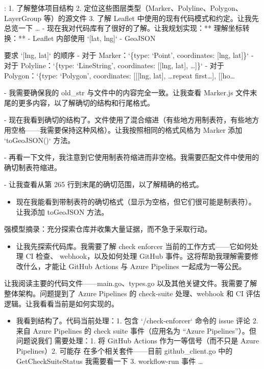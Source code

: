 \documentclass[
  10
]{article}
\providecommand{\tightlist}{%
  \setlength{\itemsep}{0pt}\setlength{\parskip}{0pt}}
\begin{document}
: 1. 了解整体项目结构 2. 定位这些图层类型（Marker、Polyline、Polygon、LayerGroup 等）的源文件 3. 了解 Leaflet 中使用的现有代码模式和约定。让我先总览一下 \ldots{} - 现在我对代码库有了很好的了解。让我规划实现：** 理解坐标转换：** - Leaflet 内部使用 `{[}lat, lng{]}` - GeoJSON



要求 `{[}lng, lat{]}` 的顺序 - 对于 Marker：`\{type: `Point', coordinates: {[}lng, lat{]}\}` - 对于 Polyline：`\{type: `LineString', coordinates: {[}{[}lng, lat{]}, \ldots{]}\}` - 对于 Polygon：`\{type: `Polygon', coordinates: {[}{[}{[}lng, lat{]}, \ldots repeat first\ldots{]}, {[}{[}ho\ldots{}

- 我需要确保我的 old\_str 与文件中的内容完全一致。让我查看 Marker.js 文件末尾的更多内容，以了解确切的结构和行尾格式。

- 现在我看到确切的结构了。文件使用了混合缩进（有些地方用制表符，有些地方用空格——我需要保持这种风格）。让我按照相同的格式风格为 Marker 添加 `toGeoJSON()` 方法。

- 再看一下文件，我注意到它使用制表符缩进而非空格。我需要匹配文件中使用的确切制表符缩进。

- 让我查看从第 265 行到末尾的确切范围，以了解精确的格式。

\begin{itemize}
\tightlist
\item
  现在我能看到带制表符的确切格式（显示为空格，但它们很可能是制表符）。让我添加
  toGeoJSON 方法。
\end{itemize}

强模型摘录：充分探索仓库并收集大量证据，而不急于采取行动。

\begin{itemize}
\tightlist
\item
  让我先探索代码库。我需要了解 check enforcer 当前的工作方式——它如何处理 CI 检查、
  webhook，以及如何处理 GitHub 事件。这将帮助我理解需要修改什么，才能让 GitHub
  Actions 与 Azure Pipelines 一起成为一等公民。
\end{itemize}

让我阅读主要的代码文件——main.go、types.go 以及其他关键文件。我需要了解整体架构。问题提到了 Azure Pipelines 的 check-suite 处理、webhook 和 CI 评估逻辑。让我看看当前是如何实现的。

\begin{itemize}
\tightlist
\item
  我看到结构了。代码当前处理：1. 包含 `/check-enforcer` 命令的 issue 评论 2. 来自
  Azure Pipelines 的 check suite 事件（应用名为 ``Azure Pipelines''）。但问题说我们
  需要处理：1. 将 GitHub Actions 作为一等信号（而不只是 Azure Pipelines）2. 可能存
  在多个相关套件——目前 github\_client.go 中的 GetCheckSuiteStatus 我需要看一下 3.
  workflow-run 事件 \ldots{}
\end{itemize}
\end{document}
